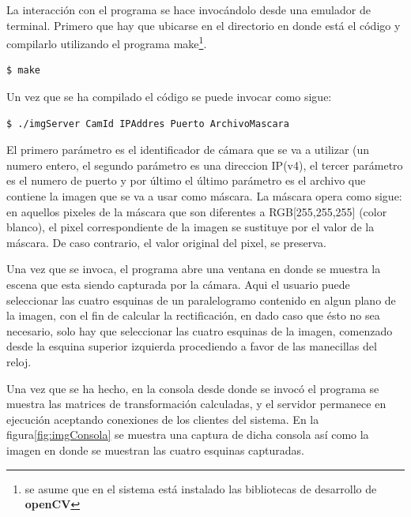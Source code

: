 \documentclass[12pt,letterpaper,notitlepage]{report}
\newlength{\spacing} \setlength{\spacing}{\baselineskip}
\newcommand{\nspace}[1]{\setlength{\baselineskip}{#1\spacing}}
\newenvironment{linespacing}[1]{\nspace{#1}}{}
\begin{document}
{\begin{linespacing}{1.5}
La interacción con el programa  se hace invocándolo desde una emulador
de terminal.  Primero que hay que  ubicarse en el directorio  en donde
está el  código y  compilarlo utilizando el  programa make\footnote{se
asume que en  el sistema está instalado las  bibliotecas de desarrollo
de \textbf{openCV}}.

\smallskip


\begin{verbatim}
$ make
\end{verbatim}


\smallskip

Un vez  que se  ha compilado  el código se  puede invocar  como sigue:
{\small
\begin{verbatim} 
$ ./imgServer CamId IPAddres Puerto ArchivoMascara
\end{verbatim} }

El primero parámetro es el identificador de cámara que se va a utilizar (un numero entero, el segundo parámetro es una direccion IP(v4), el tercer parámetro es el numero de puerto y por último el último parámetro es el archivo que contiene la imagen que se va a usar como máscara. La máscara opera como sigue: en aquellos pixeles de la máscara que son diferentes a RGB[255,255,255] (color blanco), el pixel correspondiente de la imagen se sustituye por el valor de la máscara. De caso contrario, el valor original del pixel, se preserva.

Una vez que se invoca, el programa abre una ventana en donde se muestra la escena que esta siendo capturada por la cámara. Aqui el usuario puede seleccionar las cuatro esquinas de un paralelogramo contenido en algun plano de la imagen, con el fin de calcular la rectificación, en dado caso que ésto no sea necesario, solo hay que seleccionar las cuatro esquinas de la imagen, comenzado desde la esquina superior izquierda procediendo a favor de las manecillas del reloj.

Una vez que se ha hecho, en la consola desde donde se invocó el programa se muestra las matrices de transformación calculadas, y el servidor permanece en ejecución aceptando conexiones de los clientes del sistema. En la figura\ref{fig:imgConsola} se muestra una captura de dicha consola así como la imagen en donde se muestran las cuatro esquinas capturadas.
 

\end{linespacing}}
\end{document}
